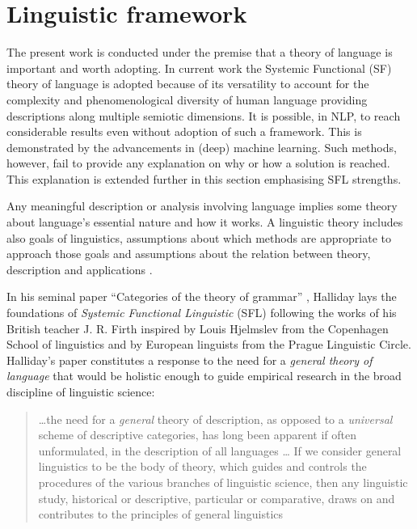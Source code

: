 \section{Linguistic framework}
\label{sec:framework}
The present work is conducted under the premise that a theory of language is important and worth adopting. In current work the Systemic Functional (SF) theory of language is adopted because of its versatility to account for the complexity and phenomenological diversity of human language providing descriptions along multiple semiotic dimensions. It is possible, in NLP, to reach considerable results even without adoption of such a framework. This is demonstrated by the advancements in (deep) machine learning. Such methods, however, fail to provide any explanation on why or how a solution is reached. This explanation is extended further in this section emphasising SFL strengths.
 
Any meaningful description or analysis involving language implies some theory about language's essential nature and how it works. A linguistic theory includes also goals of linguistics, assumptions about which methods are appropriate to approach those goals and assumptions about the relation between theory, description and applications \citep[3]{Fawcett2000}. 

In his seminal paper ``Categories of the theory of grammar'' \citep{Halliday61-orig}, Halliday lays the foundations of \textit{Systemic Functional Linguistic} (SFL) following the works of his British teacher J. R. Firth inspired by Louis Hjelmslev \citep{Hjelmslev53} from the Copenhagen School of linguistics and by European linguists from the Prague Linguistic Circle. Halliday's paper constitutes a response to the need for a \textit{general theory of language} that would be holistic enough to guide empirical research in the broad discipline of linguistic science:
\begin{quotation}
    \dots the need for a \textit{general} theory of description, as opposed to a \textit{universal} scheme of descriptive categories, has long been apparent if often unformulated, in the description of all languages \citep[54; emphasis in original]{Halliday57}
    \dots
    If we consider general linguistics to be the body of theory, which guides and controls the procedures of the various branches of linguistic science, then any linguistic study, historical or descriptive, particular or comparative, draws on and contributes to the principles of general linguistics \citep[55]{Halliday57}
\end{quotation} 

